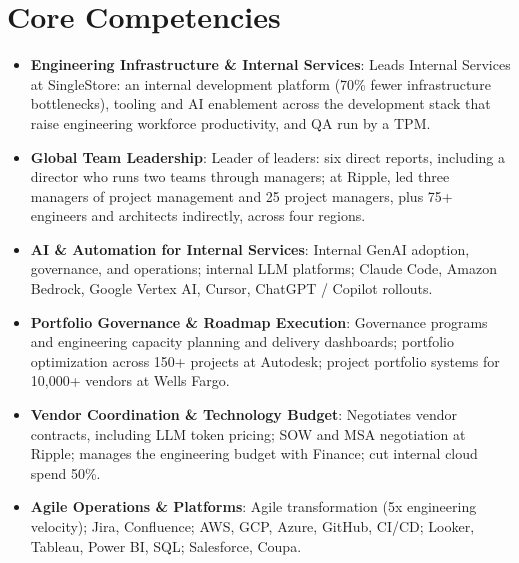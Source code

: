\documentclass[11pt,letterpaper,sans]{moderncv}
\begin{document}
\section{Core Competencies}
\vspace{1pt}
\begin{itemize}

\item \textbf{Engineering Infrastructure \& Internal Services}: Leads Internal Services at SingleStore: an internal development platform (70\% fewer infrastructure bottlenecks), tooling and AI enablement across the development stack that raise engineering workforce productivity, and QA run by a TPM.

\item \textbf{Global Team Leadership}: Leader of leaders: six direct reports, including a director who runs two teams through managers; at Ripple, led three managers of project management and 25 project managers, plus 75+ engineers and architects indirectly, across four regions.

\item \textbf{AI \& Automation for Internal Services}: Internal GenAI adoption, governance, and operations; internal LLM platforms; Claude Code, Amazon Bedrock, Google Vertex AI, Cursor, ChatGPT / Copilot rollouts.

\item \textbf{Portfolio Governance \& Roadmap Execution}: Governance programs and engineering capacity planning and delivery dashboards; portfolio optimization across 150+ projects at Autodesk; project portfolio systems for 10,000+ vendors at Wells Fargo.

\item \textbf{Vendor Coordination \& Technology Budget}: Negotiates vendor contracts, including LLM token pricing; SOW and MSA negotiation at Ripple; manages the engineering budget with Finance; cut internal cloud spend 50\%.

\item \textbf{Agile Operations \& Platforms}: Agile transformation (5x engineering velocity); Jira, Confluence; AWS, GCP, Azure, GitHub, CI/CD; Looker, Tableau, Power BI, SQL; Salesforce, Coupa.

\end{itemize}

\end{document}
